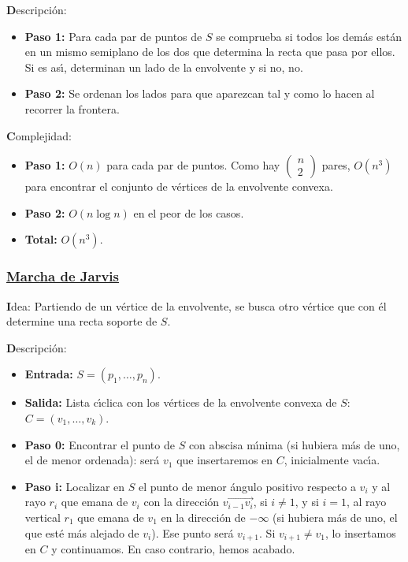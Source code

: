 \documentclass[ebook,oneside]{memoir}
\begin{document}
{\textbf Descripci\'on:}

\begin{itemize}
  \item \textbf{Paso 1:} Para cada par de puntos de $S$ se comprueba si todos los
dem\'{a}s est\'{a}n en un mismo semiplano de los dos que determina la
recta que pasa por ellos. Si es as\'{\i}, determinan un lado de la
envolvente y si no, no.
  \item \textbf{Paso 2:} Se ordenan los lados para que aparezcan tal y
como lo hacen al recorrer la frontera.
\end{itemize}


{\textbf Complejidad:}

\begin{itemize}
  \item \textbf{Paso 1:} $O(n)$ para cada par de puntos. Como hay
$\left(\begin{array}{c}n\\2\end{array}\right)$ pares, $O(n^3)$
para encontrar el conjunto de v\'{e}rtices de la envolvente convexa.
  \item \textbf{Paso 2:} $O(n\log n)$ en el peor de los casos.
  \item \textbf{Total:} $O(n^3)$.
\end{itemize}


\subsubsection{\underline{Marcha de Jarvis}}

{\textbf Idea:} Partiendo de un v\'{e}rtice de la envolvente, se
busca otro v\'{e}rtice que con \'{e}l determine una recta soporte de $S$.

\vspace{0.5cm}

{\textbf Descripci\'{o}n:}
\begin{itemize}
  \item \textbf{Entrada:} $S=(p_1,\dots,p_n)$.
  \item \textbf{Salida:} Lista c\'{\i}clica con los v\'{e}rtices de la envolvente
convexa de $S$: $C=(v_1,\dots,v_k)$.
  \item \textbf{Paso 0:} Encontrar el punto de $S$ con abscisa m\'{\i}nima (si
hubiera m\'{a}s de uno, el de menor ordenada): ser\'{a} $v_1$ que
insertaremos en $C$, inicialmente vac\'{\i}a.
  \item \textbf{Paso i:} Localizar en $S$ el punto de menor \'{a}ngulo positivo
respecto a $v_i$ y al rayo $r_i$ que emana de $v_i$ con la
direcci\'{o}n $\overrightarrow{v_{i-1}v_i}$, si $i\neq 1$, y si $i=1$,
al rayo vertical $r_1$ que emana de $v_1$ en la direcci\'{o}n de
$-\infty$ (si hubiera m\'{a}s de uno, el que est\'{e} m\'{a}s alejado de
$v_i$). Ese punto ser\'{a} $v_{i+1}$. Si $v_{i+1}\neq v_1$, lo
insertamos en $C$ y continuamos. En caso contrario, hemos acabado.
\end{itemize}
\end{document}
